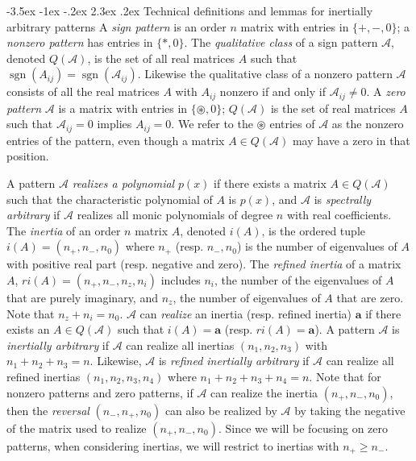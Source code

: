 \documentclass[10pt]{amsart}
\begin{document}
{               
                                      {-3.5ex \@plus -1ex \@minus -.2ex}                                      {2.3ex \@plus.2ex}                                                      {\normalfont\bfseries}}{Technical definitions and lemmas for inertially arbitrary patterns}\label{defines} 
A \emph{sign pattern} is an order $n$ matrix with entries in $\{+,-,0\}$; a \emph{nonzero pattern} has entries in $\{ *,0 \}$. 
The \emph{qualitative class} of a sign pattern ${\mathcal{A}}$, denoted $Q({\mathcal{A}})$, is the set of all real matrices $A$
such that $\operatorname{sgn}{(A_{ij})}=\operatorname{sgn}{({\mathcal{A}}_{ij})}$. Likewise the qualitative class of a nonzero 
pattern ${\mathcal{A}}$ consists of all the real matrices $A$ with $A_{ij}$ nonzero if and only if ${\mathcal{A}}_{ij}\neq 0$. 
A \emph{zero pattern} ${\mathcal{A}}$  is a matrix with entries in $\{{\circledast}, 0\}$; $Q({\mathcal{A}})$ is the set of real matrices
$A$ such that ${\mathcal{A}}_{ij}=0$ implies $A_{ij}=0$. We refer to the ${\circledast}$ entries of ${\mathcal{A}}$ as the nonzero entries
of the pattern, even though a matrix $A\in Q({\mathcal{A}})$ may have a zero in that position. 

A pattern ${\mathcal{A}}$ \emph{realizes a polynomial} $p(x)$ if there exists a matrix $A\in Q({\mathcal{A}})$ such that the characteristic polynomial of $A$ is $p(x)$, and ${\mathcal{A}}$ is \emph{spectrally arbitrary} if ${\mathcal{A}}$ realizes all monic polynomials of degree $n$ with real coefficients. The \emph{inertia} of an order $n$ matrix $A$, denoted $i(A)$, is the ordered tuple $i(A) = (n_+, n_-, n_0)$ where $n_+$ (resp. $n_-, n_0$) is the number of eigenvalues of $A$ with positive real part (resp. negative and zero). 
The \emph{refined inertia} of a matrix $A$, $ri(A) = (n_+, n_-, n_z, n_i)$ includes 
$n_i$, the number of the eigenvalues of $A$ that are purely imaginary,  and $n_z$, the number of eigenvalues of $A$ that are zero.
Note that $n_z + n_i = n_0$. ${\mathcal{A}}$ can \textit{realize} an inertia (resp. refined inertia) $\mathbf{a}$ if there exists an $A\in Q({\mathcal{A}})$ such that $i(A) = \mathbf{a}$ (resp. $ri(A) = \mathbf{a}$). A pattern ${\mathcal{A}}$ is \emph{inertially arbitrary}  if ${\mathcal{A}}$ can realize all inertias $(n_1, n_2, n_3)$ with $n_1 + n_2 + n_3 = n$. Likewise, ${\mathcal{A}}$ is \textit{refined inertially arbitrary}  if ${\mathcal{A}}$ can realize all refined inertias $(n_1, n_2, n_3, n_4)$ where $n_1 + n_2 + n_3 + n_4 = n$. 
Note that for nonzero patterns and zero patterns,  
if ${\mathcal{A}}$ can realize the inertia $(n_+, n_-, n_0)$, then the \emph{reversal} $(n_-, n_+, n_0)$ can also be realized by ${\mathcal{A}}$ by taking the negative of the matrix used to realize $(n_+, n_-, n_0)$. Since we will be focusing on zero patterns, when considering inertias, we will restrict to inertias with $n_+ \geq n_-$.
\end{document}
